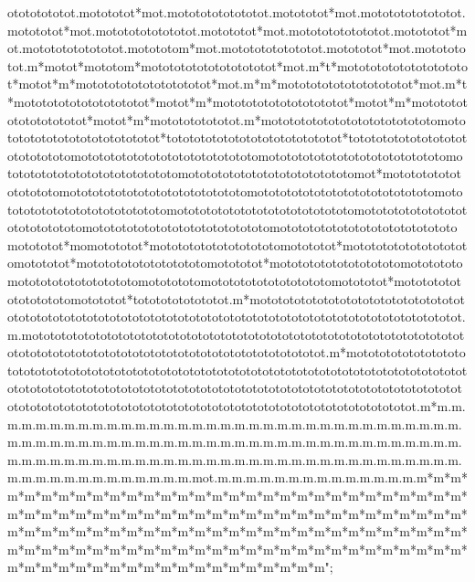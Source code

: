 otototototot.motototot*mot.motototototototot.motototot*mot.motototototototot.motototot*mot.motototototototot.motototot*mot.motototototototot.motototot*mot.motototototototot.motototom*mot.motototototototot.motototot*mot.mototototot.m*motot*mototom*mototototototototototot*mot.m*t*mototototototototototot*motot*m*mototototototototototot*mot.m*m*mototototototototototot*mot.m*t*mototototototototototot*motot*m*mototototototototototot*motot*m*mototototototototototot*motot*m*mototototototot.m*mototototototototototototototomototototototototototototototot*tototototototototototototototot*totototototototototototototototomotototototototototototototototomotototototototototototototototomotototototototototototototototomototototototototototototototomot*mototototototototototomotototototototototototototototomotototototototototototototototomotototototototototototototototomotototototototototototototototomotototototototototototototototomotototototototototototototototomotototototototototototototototomotototot*momotototot*mototototototototototomotototot*mototototototototototomotototot*mototototototototototomotototot*mototototototototototomototototomototototototototototomototototomototototototototototomotototot*mototototototototototomotototot*totototototototot.m*motototototototototototototototototototototototototototototototototototototototototototototototototototototototototot.m.motototototototototototototototototototototototototototototototototototototototototototototototototototototototototototototototototot.m*motototototototototototototototototototototototototototototototototototototototototototototototototototototototototototototototototototototototototototototototototototototototototototototototototototototototototototototototototototototototototototototot.m*m.m.m.m.m.m.m.m.m.m.m.m.m.m.m.m.m.m.m.m.m.m.m.m.m.m.m.m.m.m.m.m.m.m.m.m.m.m.m.m.m.m.m.m.m.m.m.m.m.m.m.m.m.m.m.m.m.m.m.m.m.m.m.m.m.m.m.m.m.m.m.m.m.m.m.m.m.m.m.m.m.m.m.m.m.m.m.m.m.m.m.m.m.m.m.m.m.m.m.m.m.m.m.m.m.m.m.m.m.m.m.mot.m.m.m.m.m.m.m.m.m.m.m.m.m.m.m*m*m*m*m*m*m*m*m*m*m*m*m*m*m*m*m*m*m*m*m*m*m*m*m*m*m*m*m*m*m*m*m*m*m*m*m*m*m*m*m*m*m*m*m*m*m*m*m*m*m*m*m*m*m*m*m*m*m*m*m*m*m*m*m*m*m*m*m*m*m*m*m*m*m*m*m*m*m*m*m*m*m*m*m*m*m*m*m*m*m*m*m*m*m*m*m*m*m*m*m*m*m*m*m*m*m*m*m*m*m*m*m*m*m*m*m*m*m*m*m*m*m*m*m*m*m*m*m*m";


